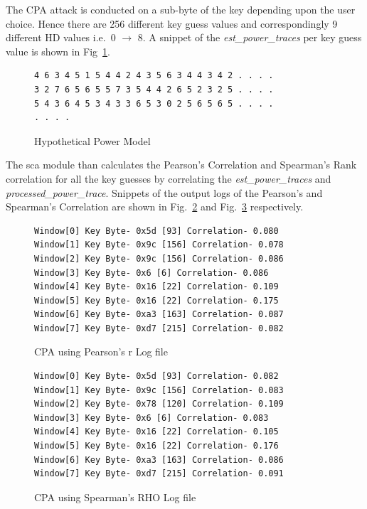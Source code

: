 \documentclass{llncs}
\numberwithin{algorithm}{chapter}
\begin{document}
The CPA attack is conducted on a sub-byte of the key depending upon the user choice. Hence 
there are 256 different key guess values and correspondingly 9 different HD values i.e.\ 0 $\rightarrow$ 8.
A snippet of the \emph{est\_power\_traces} per key guess value is shown in Fig~\ref{fig:fobos-estpower}. 
\begin{figure}[ht]
\begin{Verbatim}[frame=single]
4 6 3 4 5 1 5 4 4 2 4 3 5 6 3 4 4 3 4 2 . . . .
3 2 7 6 5 6 5 5 7 3 5 4 4 2 6 5 2 3 2 5 . . . .
5 4 3 6 4 5 3 4 3 3 6 5 3 0 2 5 6 5 6 5 . . . .
. . . .
\end{Verbatim}
\caption{\label{fig:fobos-estpower}Hypothetical Power Model}
\end{figure}

The sca module than calculates the Pearson's Correlation and Spearman's Rank correlation
for all the key guesses by correlating 
the \emph{est\_power\_traces} and \emph{processed\_power\_trace}. 
Snippets of the output logs of the Pearson's and Spearman's Correlation are shown
in Fig.~\ref{fig:pearson} and Fig.~\ref{fig:spearman} respectively.

\begin{figure}[H]
\begin{Verbatim}[frame=single]
Window[0] Key Byte- 0x5d [93] Correlation- 0.080
Window[1] Key Byte- 0x9c [156] Correlation- 0.078
Window[2] Key Byte- 0x9c [156] Correlation- 0.086
Window[3] Key Byte- 0x6 [6] Correlation- 0.086
Window[4] Key Byte- 0x16 [22] Correlation- 0.109
Window[5] Key Byte- 0x16 [22] Correlation- 0.175
Window[6] Key Byte- 0xa3 [163] Correlation- 0.087
Window[7] Key Byte- 0xd7 [215] Correlation- 0.082
\end{Verbatim}
\caption{\label{fig:pearson}CPA using Pearson's r Log file}
\end{figure}

\begin{figure}[h]
\begin{Verbatim}[frame=single]
Window[0] Key Byte- 0x5d [93] Correlation- 0.082
Window[1] Key Byte- 0x9c [156] Correlation- 0.083
Window[2] Key Byte- 0x78 [120] Correlation- 0.109
Window[3] Key Byte- 0x6 [6] Correlation- 0.083
Window[4] Key Byte- 0x16 [22] Correlation- 0.105
Window[5] Key Byte- 0x16 [22] Correlation- 0.176
Window[6] Key Byte- 0xa3 [163] Correlation- 0.086
Window[7] Key Byte- 0xd7 [215] Correlation- 0.091
\end{Verbatim}
\caption{\label{fig:spearman}CPA using Spearman's RHO Log file }
\end{figure}
\end{document}
